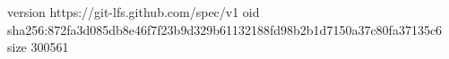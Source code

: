 version https://git-lfs.github.com/spec/v1
oid sha256:872fa3d085db8e46f7f23b9d329b61132188fd98b2b1d7150a37c80fa37135c6
size 300561
